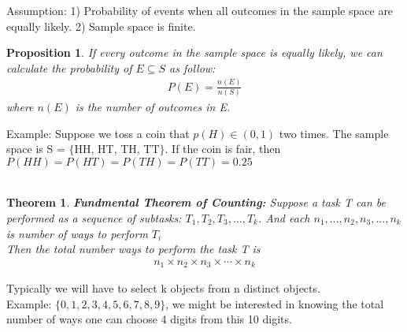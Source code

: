 \documentclass[11pt,oneside]{book}
\theoremstyle{break}
\theoremstyle{break}
\newtheorem{thm}{Theorem}[section]
\newtheorem{prop}[lem]{Proposition}
\newcommand{\example}{\color{green}Example: \color{black}}
\begin{document}
	\newpage
	Assumption: 1) Probability of events when all outcomes in the sample space are equally likely. 2) Sample space is finite.
	\begin{prop}
	If every outcome in the sample space is equally likely, we can calculate the probability of $E\subseteq S$ as follow: \begin{align*}
	P(E)=\frac{n(E)}{n(S)}
	\end{align*}
	where $n(E)$ is the number of outcomes in E. 
	\end{prop}
	\example Suppose we toss a coin that $p(H)\in (0,1)$ two times. The sample space is S = $\{$HH, HT, TH, TT$\}$. If the coin is fair, then $P(HH)=P(HT)=P(TH)=P(TT)=0.25$\\
	\hfill\\
	\begin{thm}
	\textbf{Fundmental Theorem of Counting:} Suppose a task T can be performed as a sequence of subtasks: $T_1,T_2,T_3,...,T_k$. And each $n_1,...,n_2,n_3,...,n_k$ is number of ways to perform $T_i$\\
	Then the total number ways to perform the task T is  \begin{align*}
	n_1\times n_2 \times n_3 \times \cdots \times n_k
	\end{align*}
	\end{thm} 
	Typically we will have to select k objects from n distinct objects.\\
	\example $\{0,1,2,3,4,5,6,7,8,9\}$, we might be interested in knowing the total number of ways one can choose 4 digits from this 10 digits.\\
	\hfill\\
\end{document}
